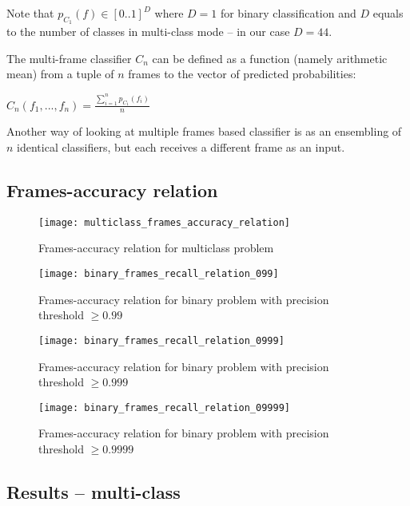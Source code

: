     Note that $p_{C_{1}}(f) \in [0..1]^D$ where $D = 1$ for binary classification
    and $D$ equals to the number of classes in multi-class mode -- in our case $D = 44$.


    The multi-frame classifier $C_{n}$ can be defined as a function (namely arithmetic mean)
    from a tuple of $n$ frames to the vector of predicted probabilities:

    \begin{center}
    $C_{n}(f_1, ..., f_n) = \frac{\sum\limits_{i=1}^{n}{p_{C_{1}}(f_{i})}}{n}$
    \end{center}

    Another way of looking at multiple frames based classifier is as an ensembling
    of $n$ identical classifiers, but each receives a different frame as an input.

    \subsection{Frames-accuracy relation}
    \begin{figure}[H]
    \caption{Frames-accuracy relation for multiclass problem}
    \centering
    \texttt{[image: multiclass\_frames\_accuracy\_relation]}
    \end{figure}

    \begin{figure}[H]
    \caption{Frames-accuracy relation for binary problem with precision threshold $\geqslant 0.99$}
    \centering
    \texttt{[image: binary\_frames\_recall\_relation\_099]}
    \end{figure}

    \begin{figure}[H]
    \caption{Frames-accuracy relation for binary problem with precision threshold $\geqslant 0.999$}
    \centering
    \texttt{[image: binary\_frames\_recall\_relation\_0999]}
    \end{figure}

    \begin{figure}[H]
    \caption{Frames-accuracy relation for binary problem with precision threshold $\geqslant 0.9999$}
    \centering
    \texttt{[image: binary\_frames\_recall\_relation\_09999]}
    \end{figure}

    \subsection{Results -- multi-class}

